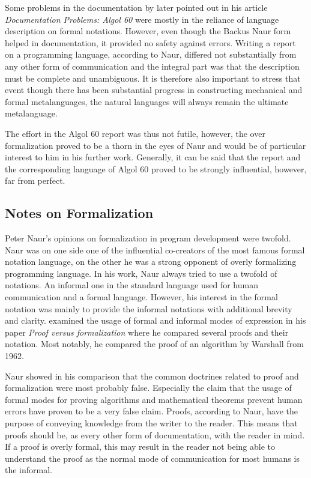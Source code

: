 \documentclass{article}
\begin{document}
Some problems in the documentation by \citet{naur1963documentation} later pointed out in his article \textit{Documentation Problems: Algol 60} were mostly in the reliance of language description on formal notations. However, even though the Backus Naur form helped in documentation, it provided no safety against errors. Writing a report on a programming language, according to Naur, differed not substantially from any other form of communication and the integral part was that the description must be complete and unambiguous. It is therefore also important to stress that event though there has been substantial progress in constructing mechanical and formal metalanguages, the natural languages will always remain the ultimate metalanguage.

The effort in the Algol 60 report was thus not futile, however, the over formalization proved to be a thorn in the eyes of Naur and would be of particular interest to him in his further work. Generally, it can be said that the report and the corresponding language of Algol 60 proved to be strongly influential, however, far from perfect.

\subsection{Notes on Formalization}
Peter Naur's opinions on formalization in program development were twofold. Naur was on one side one of the influential co-creators of the most famous formal notation language, on the other he was a strong opponent of overly formalizing programming language. In his work, Naur always tried to use a twofold of notations. An informal one in the standard language used for human communication and a formal language. However, his interest in the formal notation was mainly to provide the informal notations with additional brevity and clarity. \cite{naur1994proof} examined the usage of formal and informal modes of expression in his paper \textit{Proof versus formalization} where he compared several proofs and their notation. Most notably, he compared the proof of an algorithm by Warshall from 1962. 

Naur showed in his comparison that the common doctrines related to proof and formalization were most probably false. Especially the claim that the usage of formal modes for proving algorithms and mathematical theorems prevent human errors have proven to be a very false claim. Proofs, according to Naur, have the purpose of conveying knowledge from the writer to the reader. This means that proofs should be, as every other form of documentation, with the reader in mind. If a proof is overly formal, this may result in the reader not being able to understand the proof as the normal mode of communication for most humans is the informal.
\end{document}
